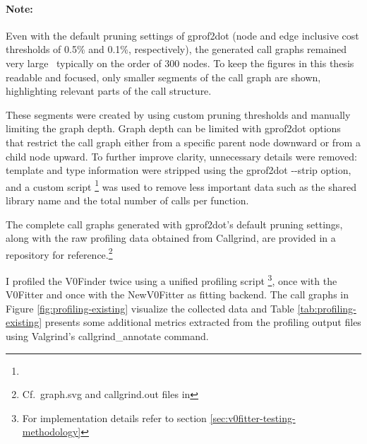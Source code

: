 \vspace{-0.5\baselineskip}
\paragraph{Note:}
Even with the default pruning settings of gprof2dot (node and edge inclusive cost thresholds of 0.5\% and 0.1\%, respectively), the generated call graphs remained very large \textemdash\ typically on the order of 300 nodes.
To keep the figures in this thesis readable and focused, only smaller segments of the call graph are shown, highlighting relevant parts of the call structure.

These segments were created by using custom pruning thresholds and manually limiting the graph depth.
Graph depth can be limited with gprof2dot options that restrict the call graph either from a specific parent node downward or from a child node upward.
To further improve clarity, unnecessary details were removed: template and type information were stripped using the gprof2dot \mbox{{-}{-}strip} option, and a custom script%
\footnote{}
was used to remove less important data such as the shared library name and the total number of calls per function.

The complete call graphs generated with gprof2dot's default pruning settings, along with the raw profiling data obtained from Callgrind, are provided in a repository for reference.\footnote{Cf.\ graph.svg and callgrind.out files in }


I profiled the V0Finder twice using a unified profiling script%
\footnote{For implementation details refer to section \ref{sec:v0fitter-testing-methodology}},
once with the V0Fitter and once with the NewV0Fitter as fitting backend.
The call graphs in Figure \ref{fig:profiling-existing} visualize the collected data and Table \ref{tab:profiling-existing} presents some additional metrics extracted from the profiling output files using Valgrind's callgrind\_annotate command.

